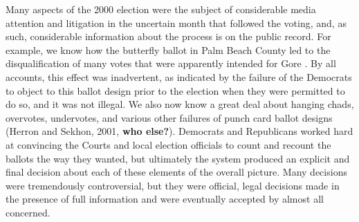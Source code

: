 \documentclass[11pt,titlepage]{article}
\begin{document}
Many aspects of the 2000 election were the subject of considerable
media attention and litigation in the uncertain month that followed
the voting, and, as such, considerable information about the process
is on the public record.  For example, we know how the butterfly
ballot in Palm Beach County led to the disqualification of many votes
that were apparently intended for Gore
\citep{wand:schot:sekh:meba:herr:brad:01}.  By all accounts, this
effect was inadvertent, as indicated by the failure of the Democrats
to object to this ballot design prior to the election when they were
permitted to do so, and it was not illegal.  We also now know a great
deal about hanging chads, overvotes, undervotes, and various other
failures of punch card ballot designs (Herron and Sekhon,
2001\nocite{HerSek01}, \textbf{who else?}).  Democrats and Republicans
worked hard at convincing the Courts and local election officials to
count and recount the ballots the way they wanted, but ultimately the
system produced an explicit and final decision about each of these
elements of the overall picture.  Many decisions were tremendously
controversial, but they were official, legal decisions made in the
presence of full information and were eventually accepted by almost
all concerned.
\end{document}
